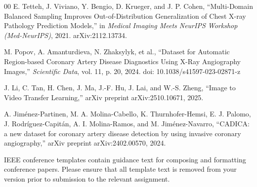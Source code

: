 \documentclass[conference]{IEEEtran}
\begin{document}
\begin{thebibliography}{00}
 E. Tetteh, J. Viviano, Y. Bengio, D. Krueger, and J. P. Cohen, ``Multi-Domain Balanced Sampling Improves Out-of-Distribution Generalization of Chest X-ray Pathology Prediction Models,'' in \textit{Medical Imaging Meets NeurIPS Workshop (Med-NeurIPS)}, 2021. arXiv:2112.13734.

 M. Popov, A. Amanturdieva, N. Zhaksylyk, et al., ``Dataset for Automatic Region-based Coronary Artery Disease Diagnostics Using X-Ray Angiography Images,'' \textit{Scientific Data}, vol. 11, p. 20, 2024. doi: 10.1038/s41597-023-02871-z

 J. Li, C. Tan, H. Chen, J. Ma, J.-F. Hu, J. Lai, and W.-S. Zheng, ``Image to Video Transfer Learning,'' arXiv preprint arXiv:2510.10671, 2025.

 A. Jiménez-Partinen, M. A. Molina-Cabello, K. Thurnhofer-Hemsi, E. J. Palomo, J. Rodríguez-Capitán, A. I. Molina-Ramos, and M. Jiménez-Navarro, ``CADICA: a new dataset for coronary artery disease detection by using invasive coronary angiography,'' arXiv preprint arXiv:2402.00570, 2024.
\end{thebibliography}
\vspace{12pt}
\color{red}
IEEE conference templates contain guidance text for composing and formatting conference papers. Please ensure that all template text is removed from your version prior to submission to the relevant assignment. 
\end{document}
